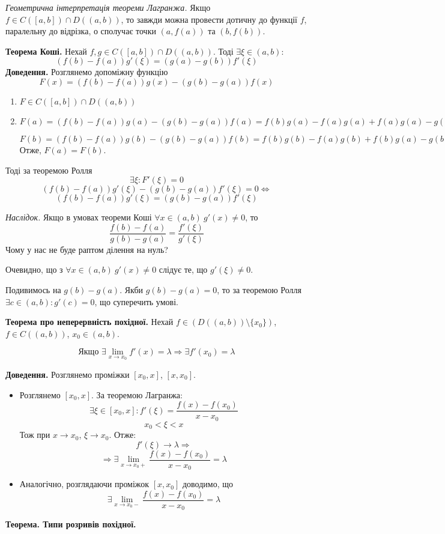 \documentclass[12pt]{report}
\begin{document}
\textit{Геометрична інтерпретація теореми Лагранжа.} Якщо $f \in C([a,b]) \cap D((a,b))$, то завжди можна провести дотичну до функції $f$, паралельну до відрізка, о сполучає точки $(a, f(a))$ та $(b, f(b))$.

\vspace{3mm}

\textbf{Теорема Коші.}  
Нехай $f, g \in C([a,b]) \cap D((a,b))$. Тоді $\exists \xi \in (a,b):$
$$(f(b) - f(a))g'(\xi) = (g(a) - g(b))f'(\xi)$$
\textbf{Доведення.} Розглянемо допоміжну функцію 
$$F(x) = (f(b) - f(a))g(x) - (g(b) - g(a))f(x)$$
\begin{enumerate}
\item $F \in C([a,b])\cap D((a,b))$
\item $F(a) = (f(b) - f(a))g(a) - (g(b) - g(a))f(a) = f(b)g(a) - f(a)g(a) + f(a)g(a) - g(b)f(a) = f(b)g(a) - g(b)f(a)$

\vspace{1mm}

$F(b) = (f(b) - f(a))g(b) - (g(b) - g(a))f(b) = f(b)g(b) - f(a)g(b) + f(b)g(a) - g(b)f(b) = f(b)g(a) - g(b)f(a)$
Отже, $F(a) = F(b)$.
\end{enumerate}

Тоді за теоремою Ролля 
$$\exists \xi : F'(\xi) = 0$$
$$(f(b) - f(a))g'(\xi) - (g(b) - g(a))f'(\xi) = 0 \Longleftrightarrow$$
$$(f(b) - f(a))g'(\xi) = (g(b) - g(a))f'(\xi) $$

\textit{Наслідок.} Якщо в умовах теореми Коші $\forall x \in (a,b) \ g'(x) \neq 0$, то
$$\frac{f(b) - f(a)}{g(b) - g(a)} = \frac{f'(\xi)}{g'(\xi)}$$
Чому у нас не буде раптом ділення на нуль?

Очевидно, що з $\forall x \in (a,b) \ g'(x) \neq 0$ слідує те, що $g'(\xi) \neq 0$.

Подивимось на $g(b) - g(a)$. Якби $g(b) - g(a) = 0$, то за теоремою Ролля $\exists c \in (a,b) : g'(c) = 0$, що суперечить умові.

\textbf{Теорема про неперервність похідної.} Нехай $f \in (D((a,b))\setminus \{x_0\})$, $f \in C((a,b))$, $x_0 \in (a,b)$.

$$\textrm{Якщо } \exists \lim_{x \to x_0}f'(x) = \lambda \Longrightarrow \exists f'(x_0) = \lambda$$

\textbf{Доведення.} Розглянемо проміжки $[x_0, x]$, $[x, x_0]$.

\begin{itemize}
\item Розглянемо $[x_0, x]$. За теоремою Лагранжа:
$$\exists \xi \in [x_0, x]: f'(\xi) = \frac{f(x) - f(x_0)}{x - x_0}$$
$$x_0 < \xi < x$$
Тож при $x \to x_0$, $\xi \to x_0$. Отже:
$$f'(\xi) \to \lambda \Longrightarrow$$
$$\Longrightarrow \exists \lim_{x \to x_0+}\frac{f(x) - f(x_0)}{x - x_0} = \lambda$$
\item Аналогічно, розглядаючи проміжок $[x, x_0]$ доводимо, що 
$$\exists \lim_{x\to x_0 - }\frac{f(x) - f(x_0)}{x - x_0} = \lambda$$

\end{itemize}
\textbf{Теорема. Типи розривів похідної.}
\end{document}
